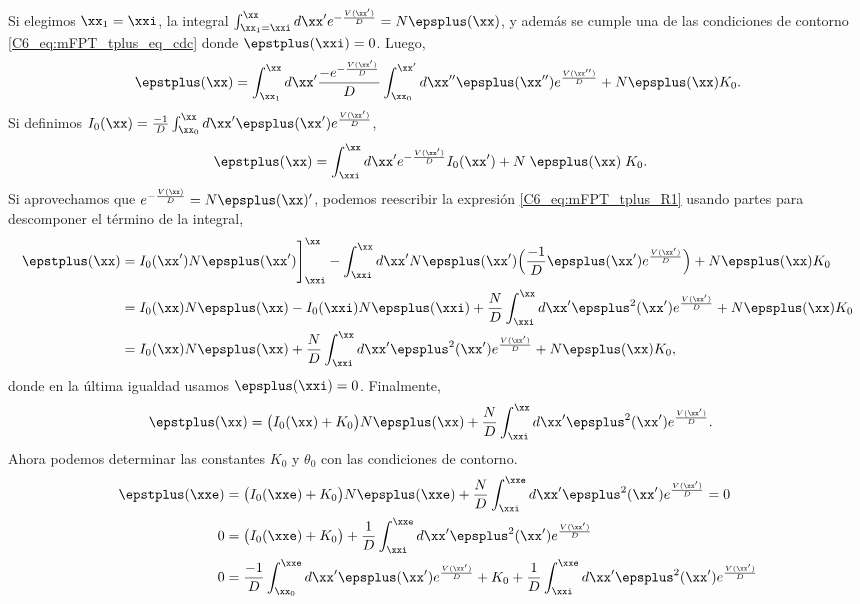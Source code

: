 {Si elegimos $\xx_1 = \xxi$, la integral $\int_{\xx_1 = \xxi}^{\xx} d\xx'  e^{- \frac{V(\xx')}{D}} = N \epsplus(\xx)$, y además se cumple una de las condiciones de contorno \ref{C6_eq:mFPT_tplus_eq_cdc} donde $\epstplus(\xxi) = 0$. Luego,
\begin{align}
   \epstplus(\xx) = \int_{\xx_1}^{\xx} d\xx'  \frac{- e^{- \frac{V(\xx')}{D}} }{D} \int_{\xx_0}^{\xx'} d \xx'' \epsplus(\xx'') e^{ \frac{V(\xx'')}{D}} + N \epsplus(\xx) K_0 .
\end{align}
Si definimos $I_0(\xx) =  \frac{-1}{D} \int_{\xx_0}^\xx d \xx' \epsplus(\xx') e^{ \frac{V(\xx')}{D}}$, 
\begin{align}
   \epstplus(\xx) &= \int_{\xxi}^{\xx} d\xx'  e^{- \frac{V(\xx')}{D}}  I_0(\xx')+  N \; \epsplus(\xx) \; K_0 .
   \label{C6_eq:mFPT_tplus_R1}
\end{align}
Si aprovechamos que $ e^{- \frac{V(\xx)}{D}} = N \epsplus(\xx)'$, podemos reescribir la expresión \ref{C6_eq:mFPT_tplus_R1} usando partes para descomponer el término de la integral,
\begin{align}
   \epstplus(\xx) &= I_0(\xx') N \epsplus(\xx') \Bigg]_{\xxi}^{\xx} - \int_{\xxi}^{\xx} d\xx' N \epsplus(\xx') \Big(\frac{-1}{D} \epsplus(\xx') e^{ \frac{V(\xx')}{D}} \Big) +  N \epsplus(\xx) K_0 \\
            &= I_0(\xx) N \epsplus(\xx) - I_0(\xxi) N \epsplus(\xxi) + \frac{N}{D} \int_{\xxi}^{\xx} d\xx'  \epsplus^2(\xx') e^{ \frac{V(\xx')}{D}} +  N \epsplus(\xx) K_0 \\
            &= I_0(\xx) N \epsplus(\xx) + \frac{N}{D} \int_{\xxi}^{\xx} d\xx'  \epsplus^2(\xx') e^{ \frac{V(\xx')}{D}} +  N \epsplus(\xx) K_0 ,
\end{align}
donde en la última igualdad usamos $\epsplus(\xxi) = 0$. Finalmente, 
\begin{align}
   \epstplus(\xx) &= \big(I_0(\xx)+K_0\big) N \epsplus(\xx) + \frac{N}{D} \int_{\xxi}^{\xx} d\xx'  \epsplus^2(\xx') e^{ \frac{V(\xx')}{D}}. 
\end{align}
Ahora podemos determinar las constantes $K_0$ y $\theta_0$ con las condiciones de contorno.
\begin{align}
   \epstplus(\xxe) &= \big(I_0(\xxe)+K_0\big) N \epsplus(\xxe) + \frac{N}{D} \int_{\xxi}^{\xxe} d\xx'  \epsplus^2(\xx') e^{ \frac{V(\xx')}{D}} = 0\\
   0&=\big(I_0(\xxe)+K_0\big) + \frac{1}{D} \int_{\xxi}^{\xxe} d\xx'  \epsplus^2(\xx') e^{ \frac{V(\xx')}{D}} \\
   0&=\frac{-1}{D} \int_{\xx_0}^{\xxe} d \xx' \epsplus(\xx') e^{ \frac{V(\xx')}{D}} +K_0 + \frac{1}{D} \int_{\xxi}^{\xxe} d\xx'  \epsplus^2(\xx') e^{ \frac{V(\xx')}{D}} \\

\end{align}}
